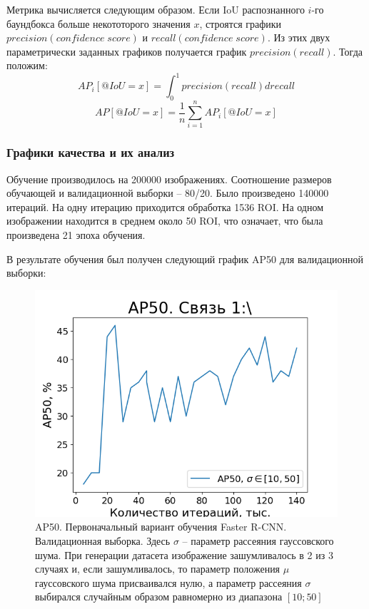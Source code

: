 Метрика вычисляется следующим образом. Если IoU распознанного $i$-го баундбокса больше некототорого значения $x$, строятся графики $precision(confidence \; score)$ и $recall(confidence \; score)$. Из этих двух параметрически заданных графиков получается график $precision(recall)$. Тогда положим:
\begin{equation}
	AP_{i}[@IoU=x] = \int_0^1 \displaystyle precision(recall)drecall
\end{equation}
\begin{equation}
	AP[@IoU=x] = \frac{1}{n} \sum_{i=1}^{n} \displaystyle AP_{i}[@IoU=x]
\end{equation}

\subsubsection{Графики качества и их анализ}

Обучение производилось на 200000 изображениях. Соотношение размеров обучающей и валидационной выборки -- 80/20. Было произведено 140000 итераций. На одну итерацию приходится обработка 1536 ROI. На одном изображении находится в среднем около 50 ROI, что означает, что была произведена 21 эпоха обучения.

В результате обучения был получен следующий график AP50 для валидационной выборки:

\begin{figure}[h!] 
	\center
	\includegraphics [scale=0.6] {my_folder/images/AP50_first}
	\caption{AP50. Первоначальный вариант обучения Faster R-CNN. Валидационная выборка. Здесь $\sigma$ -- параметр рассеяния гауссовского шума. При генерации датасета изображение зашумливалось в 2 из 3 случаях и, если зашумливалось, то параметр положения $\mu$ гауссовского шума присваивался нулю, а параметр рассеяния $\sigma$ выбирался случайным образом равномерно из диапазона $[10; 50]$}
	\label{fig:AP50_first}
\end{figure}

